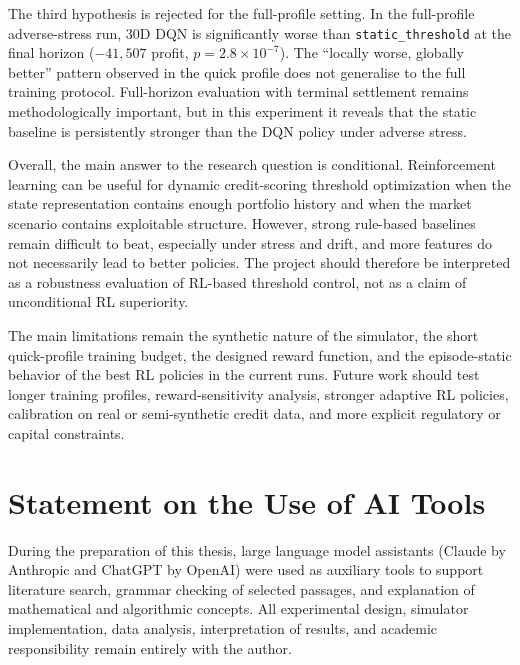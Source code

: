 \documentclass[12pt,a4paper]{article}
\begin{document}
The third hypothesis is rejected for the full-profile setting. In the full-profile adverse-stress run, 30D DQN is significantly worse than \texttt{static\_threshold} at the final horizon ($-41{,}507$ profit, $p = 2.8 \times 10^{-7}$). The ``locally worse, globally better'' pattern observed in the quick profile does not generalise to the full training protocol. Full-horizon evaluation with terminal settlement remains methodologically important, but in this experiment it reveals that the static baseline is persistently stronger than the DQN policy under adverse stress.

Overall, the main answer to the research question is conditional. Reinforcement learning can be useful for dynamic credit-scoring threshold optimization when the state representation contains enough portfolio history and when the market scenario contains exploitable structure. However, strong rule-based baselines remain difficult to beat, especially under stress and drift, and more features do not necessarily lead to better policies. The project should therefore be interpreted as a robustness evaluation of RL-based threshold control, not as a claim of unconditional RL superiority.

The main limitations remain the synthetic nature of the simulator, the short quick-profile training budget, the designed reward function, and the episode-static behavior of the best RL policies in the current runs. Future work should test longer training profiles, reward-sensitivity analysis, stronger adaptive RL policies, calibration on real or semi-synthetic credit data, and more explicit regulatory or capital constraints.

\section*{Statement on the Use of AI Tools}

During the preparation of this thesis, large language model assistants (Claude by Anthropic and ChatGPT by OpenAI) were used as auxiliary tools to support literature search, grammar checking of selected passages, and explanation of mathematical and algorithmic concepts. All experimental design, simulator implementation, data analysis, interpretation of results, and academic responsibility remain entirely with the author.






\end{document}

